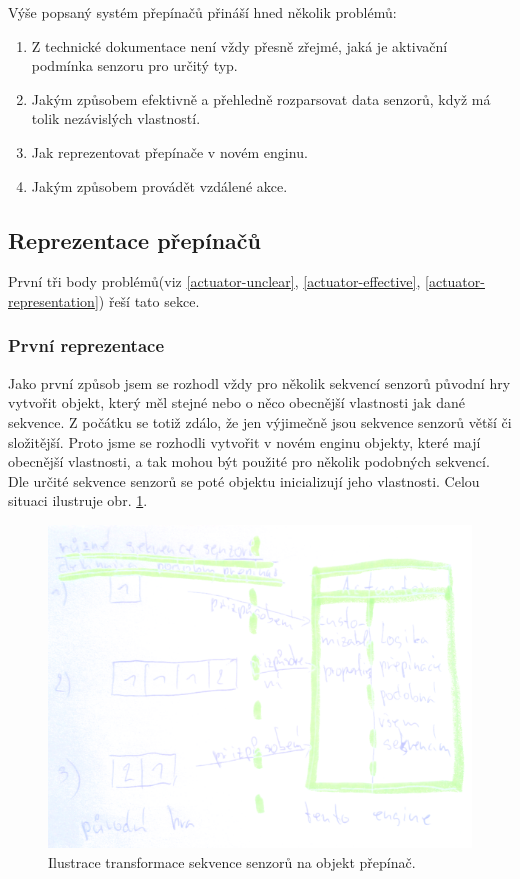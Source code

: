 Výše popsaný systém přepínačů přináší hned několik problémů:
\begin{enumerate}
\item\label{actuator-unclear} Z technické dokumentace\cite{TechnicalDocumentationFontanel05} není vždy přesně zřejmé, jaká je aktivační podmínka senzoru pro určitý typ.
\item\label{actuator-effective} Jakým způsobem efektivně a přehledně rozparsovat data senzorů, když má tolik nezávislých vlastností.
\item\label{actuator-representation} Jak reprezentovat přepínače v novém enginu.
\item\label{actuator-remote-actions} Jakým způsobem provádět vzdálené akce.
\end{enumerate}

\subsection{Reprezentace přepínačů}
První tři body problémů(viz \ref{actuator-unclear}, \ref{actuator-effective}, \ref{actuator-representation}) řeší tato sekce.

\subsubsection{První reprezentace}\label{rep-v1}

Jako první způsob jsem se rozhodl vždy pro několik sekvencí senzorů původní hry vytvořit objekt, který měl stejné nebo o něco obecnější vlastnosti jak dané sekvence.
Z počátku se totiž zdálo, že jen výjimečně jsou sekvence senzorů větší či složitější. Proto jsme se rozhodli vytvořit v
novém enginu objekty, které mají obecnější vlastnosti, a tak mohou být použité pro několik podobných sekvencí. Dle určité sekvence senzorů se poté
objektu inicializují jeho vlastnosti. Celou situaci ilustruje obr. \ref{actuator-object}.

\begin{figure}[H]\centering
\includegraphics[width=\textwidth]{./img/actuator-object.png}
\caption{Ilustrace transformace sekvence senzorů na objekt přepínač.}
\label{actuator-object}
\end{figure}

